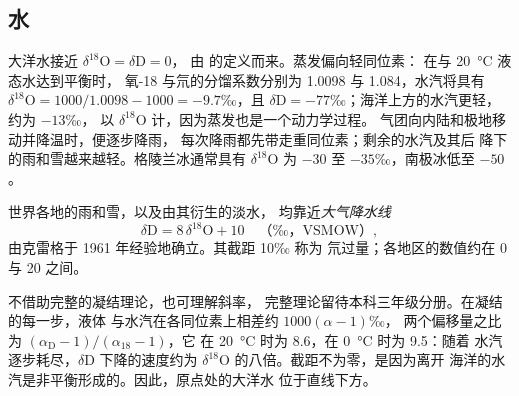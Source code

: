 \subsection{水}

大洋水接近 $\delta^{18}\mathrm{O} = \delta\mathrm{D} = 0$，
由  的定义而来。蒸发偏向轻同位素：
在与 \qty{20}{\degreeCelsius} 液态水达到平衡时，
氧-18 与氘的分馏系数分别为 1.0098 与 1.084，水汽将具有
$\delta^{18}\mathrm{O} = 1000/1.0098 - 1000 = -9.7$‰，且 $\delta\mathrm{D} =
-77$‰；海洋上方的水汽更轻，约为 $-13$‰，
以 $\delta^{18}\mathrm{O}$ 计，因为蒸发也是一个动力学过程。
气团向内陆和极地移动并降温时，便逐步降雨，
每次降雨都先带走重同位素；剩余的水汽及其后
降下的雨和雪越来越轻。格陵兰冰通常具有
$\delta^{18}\mathrm{O}$ 为 $-30$ 至 $-35$‰，南极冰低至 $-50$。

\begin{proposition}[大气降水线]\label{prop:b2:isotope-geochemistry:mwl}
世界各地的雨和雪，以及由其衍生的淡水，
均靠近\emph{大气降水线}
\[
  \delta\mathrm{D} = 8\,\delta^{18}\mathrm{O} + 10 \quad\text{（‰，VSMOW）},
\]
由克雷格于 1961 年经验地确立。其截距 10‰ 称为
氘过量；各地区的数值约在 0 与 20 之间。
\end{proposition}
\admitted

\noindent 不借助完整的凝结理论，也可理解斜率，
完整理论留待本科三年级分册。在凝结的每一步，液体
与水汽在各同位素上相差约 $1000(\alpha - 1)$‰，
两个偏移量之比为 $(\alpha_{\mathrm D}-1)/(\alpha_{18}-1)$，它
在 \qty{20}{\degreeCelsius} 时为 8.6，在 \qty{0}{\degreeCelsius} 时为 9.5：随着
水汽逐步耗尽，$\delta\mathrm{D}$ 下降的速度约为
$\delta^{18}\mathrm{O}$ 的八倍。截距不为零，是因为离开
海洋的水汽是非平衡形成的。因此，原点处的大洋水
位于直线下方。

